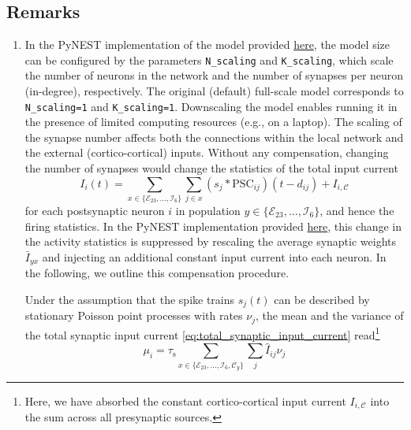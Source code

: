 \documentclass[10pt,a4paper,twoside,american]{article}
\theoremstyle{definitionstyle}
\newcommand{\tauS}{\tau_\text{s}}
\begin{document}
\begin{appendices}
\section{Remarks}
\label{sec:remarks}
\begin{enumerate}
\item \label{remark:network_scaling}
  In the PyNEST implementation of the model provided \href{https://github.com/INM-6/microcircuit-PD14-model}{here}, the model size can be configured by the parameters \texttt{N\_scaling} and \texttt{K\_scaling}, which scale the number of neurons in the network and the number of synapses per neuron (in-degree), respectively. 
  The original (default) full-scale model corresponds to \texttt{N\_scaling=1} and \texttt{K\_scaling=1}.
  Downscaling the model enables running it in the presence of limited computing resources (e.g., on a laptop).
  The scaling of the synapse number affects both the connections within the local network and the external (cortico-cortical) inputs.
  Without any compensation, changing the number of synapses would change the statistics of the total input current
  \begin{equation}
    \label{eq:total_synaptic_input_current}
    I_i(t)=\sum_{x\in\{\mathcal{E}_{23},\ldots,\mathcal{I}_{6}\}} \sum_{j\in{}x} (s_j* \text{PSC}_{ij})(t-d_{ij}) + I_{i,\mathcal{C}}
  \end{equation}
  for each postsynaptic neuron $i$ in population $y\in\{\mathcal{E}_{23},\ldots,\mathcal{I}_{6}\}$, and hence the firing statistics.
  In the PyNEST implementation provided \href{https://github.com/INM-6/microcircuit-PD14-model}{here}, this change in the activity statistics is suppressed by rescaling the average synaptic weights $\bar{I}_{yx}$ and injecting an additional constant input current into each neuron.
  In the following, we outline this compensation procedure.
  \par  
  Under the assumption that the spike trains $s_j(t)$ can be described by stationary Poisson point processes with rates $\nu_j$, the mean and the variance of the total synaptic input current \cref{eq:total_synaptic_input_current} read\footnote{Here, we have absorbed the constant cortico-cortical input current $I_{i,\mathcal{C}}$ into the sum across all presynaptic sources.}
  \begin{equation}
    \label{eq:mean_and_variances_synaptic_input}
      \mu_i      =             \tauS \sum_{x\in\{\mathcal{E}_{23},\ldots,\mathcal{I}_{6},\mathcal{C}_y\}} \sum_j \hat{I}_{ij}   \nu_j 

\end{equation}
\end{enumerate}
\end{appendices}
\end{document}
